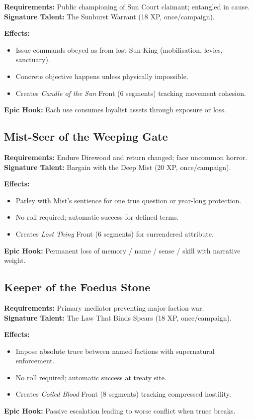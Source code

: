 \textbf{Requirements:} Public championing of Sun Court claimant; entangled in cause.\\
\textbf{Signature Talent:} The Sunburst Warrant (18 XP, once/campaign).

\textbf{Effects:}
\begin{itemize}
    \item Issue commands obeyed as from lost Sun-King (mobilisation, levies, sanctuary).
    \item Concrete objective happens unless physically impossible.
    \item Creates \emph{Candle of the Sun} Front (6 segments) tracking movement cohesion.
\end{itemize}
\textbf{Epic Hook:} Each use consumes loyalist assets through exposure or loss.

\subsection{Mist-Seer of the Weeping Gate}\label{subsec:mist_seer}

\textbf{Requirements:} Endure Direwood and return changed; face uncommon horror.\\
\textbf{Signature Talent:} Bargain with the Deep Mist (20 XP, once/campaign).

\textbf{Effects:}
\begin{itemize}
    \item Parley with Mist's sentience for one true question or year-long protection.
    \item No roll required; automatic success for defined terms.
    \item Creates \emph{Lost Thing} Front (6 segments) for surrendered attribute.
\end{itemize}
\textbf{Epic Hook:} Permanent loss of memory / name / sense / skill with narrative weight.

\subsection{Keeper of the Foedus Stone}\label{subsec:foedus_keeper}

\textbf{Requirements:} Primary mediator preventing major faction war.\\
\textbf{Signature Talent:} The Law That Binds Spears (18 XP, once/campaign).

\textbf{Effects:}
\begin{itemize}
    \item Impose absolute truce between named factions with supernatural enforcement.
    \item No roll required; automatic success at treaty site.
    \item Creates \emph{Coiled Blood} Front (8 segments) tracking compressed hostility.
\end{itemize}
\textbf{Epic Hook:} Passive escalation leading to worse conflict when truce breaks.

